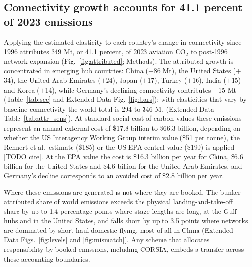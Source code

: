 \documentclass[12pt]{extarticle}
\begin{document}
\begin{table}[H]
{\begin{threeparttable}
\begin{tablenotes}[flushleft]
\end{tablenotes}
\end{threeparttable}}
\end{table}

\subsection*{Connectivity growth accounts for 41.1 percent of 2023
emissions}
Applying the estimated elasticity to each country's change in
connectivity since 1996 attributes 349 Mt, or 41.1 percent, of 2023
aviation CO$_2$ to post-1996 network expansion (Fig.~\ref{fig:attributed};
Methods). The attributed growth is concentrated in emerging hub countries:
China ($+$86 Mt), the United States ($+$34), the United Arab Emirates
($+$24), Japan ($+$17), Turkey ($+$16), India ($+$15) and Korea ($+$14),
while Germany's declining connectivity contributes $-$15 Mt
(Table~\ref{tab:scc} and Extended Data Fig.~\ref{fig:bars}); with
elasticities that vary by baseline connectivity the world total is 294 to
346 Mt (Extended Data Table~\ref{tab:attr_sens}). At standard
social-cost-of-carbon values these emissions represent an annual external
cost of \$17.8 billion to \$66.3 billion, depending on whether the US
Interagency Working Group interim value (\$51 per tonne), the Rennert et
al.\ estimate (\$185) or the US EPA central value (\$190) is applied [TODO
cite]. At the EPA value the cost is \$16.3 billion per year for China,
\$6.6 billion for the United States and \$4.6 billion for the United Arab
Emirates, and Germany's decline corresponds to an avoided cost of \$2.8
billion per year.

Where these emissions are generated is not where they are booked. The
bunker-attributed share of world emissions exceeds the physical
landing-and-take-off share by up to 1.4 percentage points where stage
lengths are long, at the Gulf hubs and in the United States, and falls
short by up to 3.5 points where networks are dominated by short-haul
domestic flying, most of all in China (Extended Data
Figs.~\ref{fig:levels} and \ref{fig:mismatch}). Any scheme that allocates
responsibility by booked emissions, including CORSIA, embeds a transfer
across these accounting boundaries.
\end{document}
